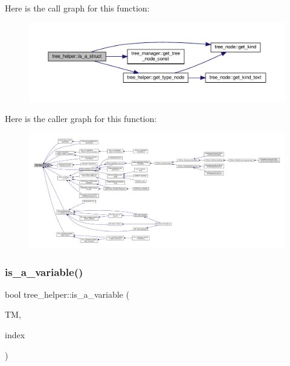 Here is the call graph for this function\+:
\nopagebreak
\begin{figure}[H]
\begin{center}
\leavevmode
\includegraphics[width=350pt]{d7/d99/classtree__helper_a6035a0cd06adda67cd4e0ff655f30527_cgraph}
\end{center}
\end{figure}
Here is the caller graph for this function\+:
\nopagebreak
\begin{figure}[H]
\begin{center}
\leavevmode
\includegraphics[width=350pt]{d7/d99/classtree__helper_a6035a0cd06adda67cd4e0ff655f30527_icgraph}
\end{center}
\end{figure}
\mbox{\label{classtree__helper_a4d6b6fc3da723a3aad8b884f9dd7ad9d}} 
\subsubsection{\texorpdfstring{is\+\_\+a\+\_\+variable()}{is\_a\_variable()}}
{\footnotesize\ttfamily bool tree\+\_\+helper\+::is\+\_\+a\+\_\+variable (\begin{DoxyParamCaption}\item[{const \hyperlink{tree__manager_8hpp_a792e3f1f892d7d997a8d8a4a12e39346}{tree\+\_\+manager\+Const\+Ref} \&}]{TM,  }\item[{const unsigned int}]{index }\end{DoxyParamCaption})\hspace{0.3cm}{\ttfamily [static]}}

